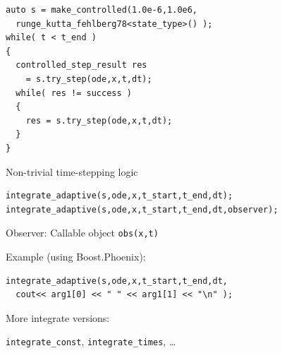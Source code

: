 \begin{frame}[fragile]


\vspace{2ex}

\begin{lstlisting}
auto s = make_controlled(1.0e-6,1.0e6,
  runge_kutta_fehlberg78<state_type>() );
while( t < t_end )
{
  controlled_step_result res
    = s.try_step(ode,x,t,dt);
  while( res != success )
  {
    res = s.try_step(ode,x,t,dt);
  }
}
\end{lstlisting}

\centerline{Non-trivial time-stepping logic}

\end{frame}


\begin{frame}[fragile]


\vspace{2ex}


\begin{lstlisting}
integrate_adaptive(s,ode,x,t_start,t_end,dt); 
integrate_adaptive(s,ode,x,t_start,t_end,dt,observer);
\end{lstlisting}

Observer: Callable object {\tt obs(x,t)}

\vspace{4ex}
Example (using Boost.Phoenix):
\begin{lstlisting}
integrate_adaptive(s,ode,x,t_start,t_end,dt,
  cout<< arg1[0] << " " << arg1[1] << "\n" );
\end{lstlisting}

\vspace{2ex}
More integrate versions:

{\tt integrate\_const}, {\tt integrate\_times}, \dots

\end{frame}



